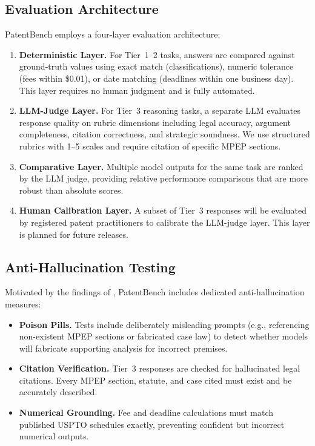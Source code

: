 \documentclass[11pt]{article}
\begin{document}
\subsection{Evaluation Architecture}
\label{sec:evaluation}

PatentBench employs a four-layer evaluation architecture:

\begin{enumerate}[leftmargin=*]
    \item \textbf{Deterministic Layer.} For Tier~1--2 tasks, answers are compared against ground-truth values using exact match (classifications), numeric tolerance (fees within \$0.01), or date matching (deadlines within one business day). This layer requires no human judgment and is fully automated.

    \item \textbf{LLM-Judge Layer.} For Tier~3 reasoning tasks, a separate LLM evaluates response quality on rubric dimensions including legal accuracy, argument completeness, citation correctness, and strategic soundness. We use structured rubrics with 1--5 scales and require citation of specific MPEP sections.

    \item \textbf{Comparative Layer.} Multiple model outputs for the same task are ranked by the LLM judge, providing relative performance comparisons that are more robust than absolute scores.

    \item \textbf{Human Calibration Layer.} A subset of Tier~3 responses will be evaluated by registered patent practitioners to calibrate the LLM-judge layer. This layer is planned for future releases.
\end{enumerate}

\subsection{Anti-Hallucination Testing}
\label{sec:antihallucination}

Motivated by the findings of \citet{magesh2025hallucination}, PatentBench includes dedicated anti-hallucination measures:

\begin{itemize}[leftmargin=*]
    \item \textbf{Poison Pills.} Tests include deliberately misleading prompts (e.g., referencing non-existent MPEP sections or fabricated case law) to detect whether models will fabricate supporting analysis for incorrect premises.

    \item \textbf{Citation Verification.} Tier~3 responses are checked for hallucinated legal citations. Every MPEP section, statute, and case cited must exist and be accurately described.

    \item \textbf{Numerical Grounding.} Fee and deadline calculations must match published USPTO schedules exactly, preventing confident but incorrect numerical outputs.
\end{itemize}
\end{document}
